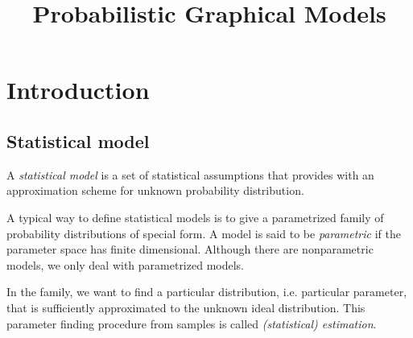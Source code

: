 \documentclass{../exp}
\title{Probabilistic Graphical Models}
\begin{document}
\maketitle
\tableofcontents





%     



\section{Introduction}

\subsection{Statistical model}
\begin{defn}
A \emph{statistical model} is a set of statistical assumptions that provides with an approximation scheme for unknown probability distribution.
\end{defn}
A typical way to define statistical models is to give a parametrized family of probability distributions of special form.
A model is said to be \emph{parametric} if the parameter space has finite dimensional.
Although there are nonparametric models, we only deal with parametrized models.

In the family, we want to find a particular distribution, i.e. particular parameter, that is sufficiently approximated to the unknown ideal distribution.
This parameter finding procedure from samples is called \emph{(statistical) estimation}.
\end{document}

